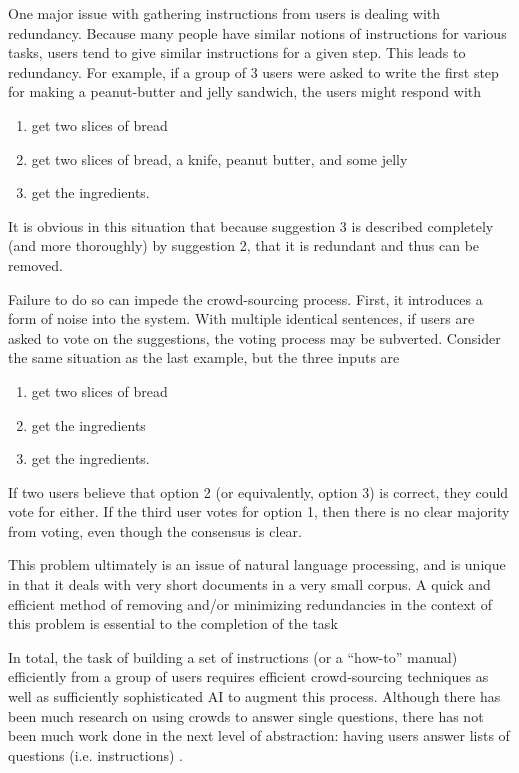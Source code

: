 One major issue with gathering instructions from users is dealing with redundancy.
Because many people have similar notions of instructions for various tasks, users tend to give similar instructions for a given step.
This leads to redundancy. For example, if a group of 3 users were asked to write the first step for making a peanut-butter and jelly sandwich, the users might respond with
\begin{enumerate}
\item get two slices of bread
\item get two slices of bread, a knife, peanut butter, and some jelly
\item get the ingredients.
\end{enumerate}
It is obvious in this situation that because suggestion 3 is described completely (and more thoroughly) by suggestion 2, that it is redundant and thus can be removed.

Failure to do so can impede the crowd-sourcing process.
First, it introduces a form of noise into the system.
With multiple identical sentences, if users are asked to vote on the suggestions, the voting process may be subverted.
Consider the same situation as the last example, but the three inputs are
\begin{enumerate}
\item get two slices of bread
\item get the ingredients
\item get the ingredients.
\end{enumerate}
If two users believe that option 2 (or equivalently, option 3) is correct, they could vote for either. 
If the third user votes for option 1, then there is no clear majority from voting, even though the consensus is clear.

This problem ultimately is an issue of natural language processing, and is unique in that it deals with very short documents in a very small corpus. 
A quick and efficient method of removing and/or minimizing redundancies in the context of this problem is essential to the completion of the task

In total, the task of building a set of instructions (or a ``how-to'' manual) efficiently from a group of users requires efficient crowd-sourcing techniques as well as sufficiently sophisticated AI to augment this process.
Although there has been much research on using crowds to answer single questions, there has not been much work done in the next level of abstraction: having users answer lists of questions (i.e. instructions) \cite{lasecki2013chorus,bigham2010vizwiz}.